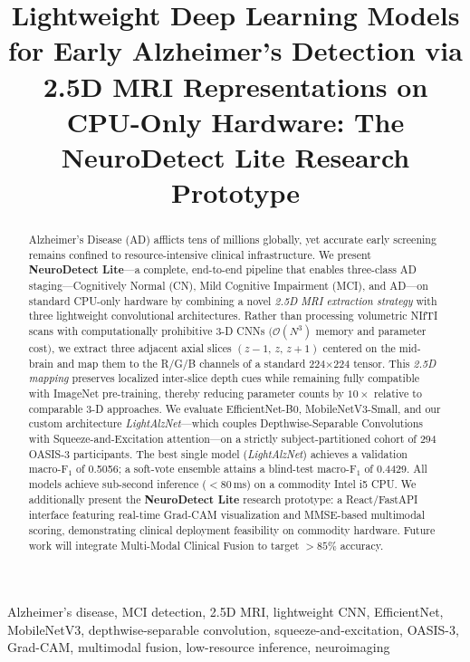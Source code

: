 \documentclass[conference]{IEEEtran}
\title{Lightweight Deep Learning Models for Early Alzheimer's
Detection via 2.5D MRI Representations on CPU-Only Hardware:
The NeuroDetect Lite Research Prototype}
\author{
  \IEEEauthorblockN{BMO}
  \IEEEauthorblockA{
    Department of Computer Science\\
    University of Ibn Khaldoun, Tiaret\\
    mohamedoussama.belalia@univ-tiaret.dz
  }
}
\newcommand{\OASIS}{OASIS-3\xspace}
\newcommand{\modelname}{\textit{LightAlzNet}\xspace}
\newcommand{\F}{\mathrm{F_1}}
\begin{document}
\maketitle

\begin{abstract}
Alzheimer's Disease (AD) afflicts tens of millions globally, yet
accurate early screening remains confined to resource-intensive
clinical infrastructure. We present \textbf{NeuroDetect Lite}---a
complete, end-to-end pipeline that enables three-class AD
staging---Cognitively Normal (CN), Mild Cognitive Impairment
(MCI), and AD---on standard CPU-only hardware by combining a
novel \emph{2.5D MRI extraction strategy} with three lightweight
convolutional architectures. Rather than processing volumetric
NIfTI scans with computationally prohibitive 3-D CNNs
$\bigl(\mathcal{O}(N^3)$ memory and parameter cost$\bigr)$, we
extract three adjacent axial slices $(z{-}1,\,z,\,z{+}1)$
centered on the mid-brain and map them to the R/G/B channels of
a standard 224$\times$224 tensor. This \emph{2.5D mapping}
preserves localized inter-slice depth cues while remaining fully
compatible with ImageNet pre-training, thereby reducing parameter
counts by $10\times$ relative to comparable 3-D approaches. We
evaluate EfficientNet-B0, MobileNetV3-Small, and our custom
architecture \modelname---which couples Depthwise-Separable
Convolutions with Squeeze-and-Excitation attention---on a
strictly subject-partitioned cohort of 294 \OASIS participants.
The best single model (\modelname) achieves a validation
macro-$\F$ of 0.5056; a soft-vote ensemble attains a blind-test
macro-$\F$ of 0.4429. All models achieve sub-second inference
($<\!80\,$ms) on a commodity Intel i5 CPU. We additionally
present the \textbf{NeuroDetect Lite} research prototype: a
React/FastAPI interface featuring real-time Grad-CAM
visualization and MMSE-based multimodal scoring, demonstrating
clinical deployment feasibility on commodity hardware.
Future work will integrate Multi-Modal Clinical Fusion to target
$>\!85\%$ accuracy.
\end{abstract}

\begin{IEEEkeywords}
Alzheimer's disease, MCI detection, 2.5D MRI, lightweight CNN,
EfficientNet, MobileNetV3, depthwise-separable convolution,
squeeze-and-excitation, OASIS-3, Grad-CAM, multimodal fusion,
low-resource inference, neuroimaging
\end{IEEEkeywords}
\end{document}
